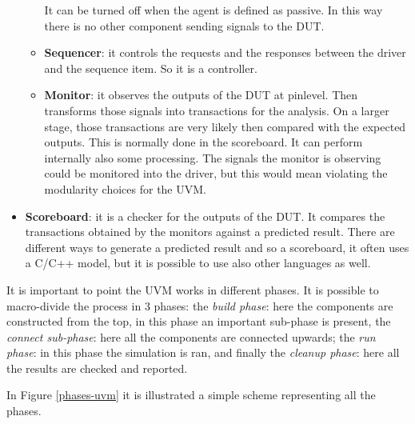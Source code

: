 \begin{itemize}
\begin{itemize}
        It can be turned off when the agent is defined as passive. In this way there is no other component sending signals to the DUT.

        
         \item \textbf{Sequencer}: it controls the requests and the responses between the driver and the sequence item. So it is a controller.
         
        \item \textbf{Monitor}: it observes the outputs of the DUT at pinlevel. Then transforms those signals into transactions for the analysis.
        On a larger stage, those transactions are very likely then compared with the expected outputs. This is normally done in the scoreboard.
        It can perform internally also some processing.
        The signals the monitor is observing could be monitored into the driver, but this would mean violating the modularity choices for the UVM.

        
    \end{itemize}
    
    \item \textbf{Scoreboard}: it is a checker for the outputs of the DUT. It compares the transactions obtained by the monitors against a predicted result.
    There are different ways to generate a predicted result and so a scoreboard, it often uses a C/C++ model, but it is possible to use also other languages as well.
    
\end{itemize}


It is important to point the UVM works in different phases.
It is possible to macro-divide the process in 3 phases: the \textit{build phase}: here the components are constructed from the top, in this phase an important sub-phase is present, the \textit{connect sub-phase}: here all the components are connected upwards; the \textit{run phase}: in this phase the simulation is ran, and finally the \textit{cleanup phase}: here all the results are checked and reported.

In Figure \ref{phases-uvm} it is illustrated a simple scheme representing all the phases.


